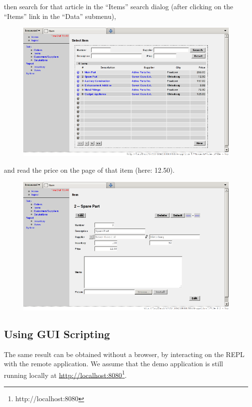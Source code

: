 then search for that article in the ``Items'' search dialog (after clicking on the
``Items'' link in the ``Data'' submenu),

\begin{figure}[H]
\centering
\includegraphics[scale=.4]{graphics/gui-script3.jpg}
\end{figure}


and read the price on the page of that item (here: 12.50).

\begin{figure}[H]
\centering
\includegraphics[scale=.4]{graphics/gui-script4.jpg}
\end{figure}


\subsection{Using GUI Scripting}
\label{sec:gui-script-using-gui-scripting}

The same result can be obtained without a browser, by interacting on
the REPL with the remote application. We assume that the demo
application is still running locally at
\underline{http://localhost:8080}\footnote{http://localhost:8080}.

